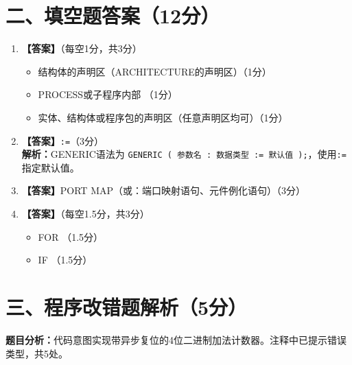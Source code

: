 \section{二、填空题答案（12分）}

\begin{enumerate}[label=\arabic*.]

\item \textbf{【答案】}（每空1分，共3分）
\begin{itemize}
  \item 结构体的声明区（ARCHITECTURE的声明区）\hfill（1分）
  \item PROCESS或子程序内部 \hfill（1分）
  \item 实体、结构体或程序包的声明区（任意声明区均可）\hfill（1分）
\end{itemize}

\item \textbf{【答案】}\verb|:=|\hfill（3分）\\
\textbf{解析：}GENERIC语法为 \verb|GENERIC ( 参数名 : 数据类型 := 默认值 );|，使用\verb|:=|指定默认值。

\item \textbf{【答案】}PORT MAP（或：端口映射语句、元件例化语句）\hfill（3分）

\item \textbf{【答案】}\hfill（每空1.5分，共3分）
\begin{itemize}
  \item FOR \hfill（1.5分）
  \item IF \hfill（1.5分）
\end{itemize}

\end{enumerate}

\section{三、程序改错题解析（5分）}

\textbf{题目分析：}代码意图实现带异步复位的4位二进制加法计数器。注释中已提示错误类型，共5处。

